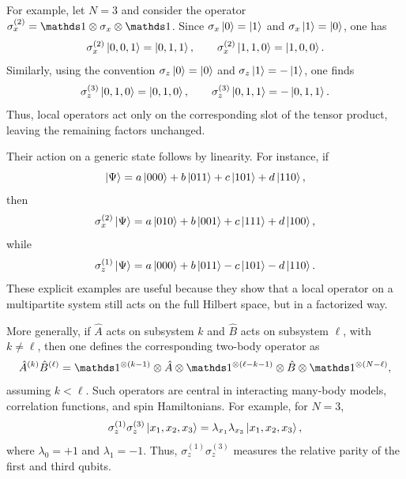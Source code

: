 For example, let \(N=3\) and consider the operator \(\sigma_x^{(2)}=\id\otimes\sigma_x\otimes\id\). Since \(\sigma_x\ket{0}=\ket{1}\) and \(\sigma_x\ket{1}=\ket{0}\), one has
\begin{equation}
	\sigma_x^{(2)}\ket{0,0,1}
	=
	\ket{0,1,1},
	\qquad
	\sigma_x^{(2)}\ket{1,1,0}
	=
	\ket{1,0,0}.
	\label{eq:intro_qm_sigma_x_second_qubit_example}
\end{equation}
Similarly, using the convention \(\sigma_z\ket{0}=\ket{0}\) and \(\sigma_z\ket{1}=-\ket{1}\), one finds
\begin{equation}
	\sigma_z^{(3)}\ket{0,1,0}=\ket{0,1,0},
	\qquad
	\sigma_z^{(3)}\ket{0,1,1}=-\ket{0,1,1}.
	\label{eq:intro_qm_sigma_z_third_qubit_example}
\end{equation}
Thus, local operators act only on the corresponding slot of the tensor product, leaving the remaining factors unchanged.

Their action on a generic state follows by linearity. For instance, if
\begin{equation}
	\ket{\Psi}=a\ket{000}+b\ket{011}+c\ket{101}+d\ket{110},
	\label{eq:intro_qm_three_qubit_generic_example}
\end{equation}
then
\begin{equation}
	\sigma_x^{(2)}\ket{\Psi}
	=
	a\ket{010}+b\ket{001}+c\ket{111}+d\ket{100},
	\label{eq:intro_qm_sigma_x_second_qubit_generic_example}
\end{equation}
while
\begin{equation}
	\sigma_z^{(1)}\ket{\Psi}
	=
	a\ket{000}+b\ket{011}-c\ket{101}-d\ket{110}.
	\label{eq:intro_qm_sigma_z_first_qubit_generic_example}
\end{equation}
These explicit examples are useful because they show that a local operator on a multipartite system still acts on the full Hilbert space, but in a factorized way.

More generally, if \(\hat A\) acts on subsystem \(k\) and \(\hat B\) acts on subsystem \(\ell\), with \(k\neq \ell\), then one defines the corresponding two-body operator as
\begin{equation}
	\hat A^{(k)}\hat B^{(\ell)}
	=
	\id^{\otimes (k-1)}\otimes \hat A \otimes \id^{\otimes (\ell-k-1)}\otimes \hat B \otimes \id^{\otimes (N-\ell)},
	\label{eq:intro_qm_two_body_operator_definition}
\end{equation}
assuming \(k<\ell\). Such operators are central in interacting many-body models, correlation functions, and spin Hamiltonians. For example, for \(N=3\),
\begin{equation}
	\sigma_z^{(1)}\sigma_z^{(3)}\ket{x_1,x_2,x_3}
	=
	\lambda_{x_1}\lambda_{x_3}\ket{x_1,x_2,x_3},
	\label{eq:intro_qm_sigma_z_sigma_z_action}
\end{equation}
where \(\lambda_0=+1\) and \(\lambda_1=-1\). Thus, \(\sigma_z^{(1)}\sigma_z^{(3)}\) measures the relative parity of the first and third qubits.

